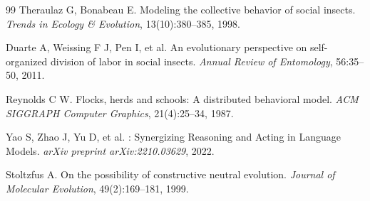 \documentclass[12pt,a4paper]{ctexart}
\begin{document}
\begin{thebibliography}{99}
Theraulaz G, Bonabeau E.
\newblock Modeling the collective behavior of social insects.
\newblock \emph{Trends in Ecology \& Evolution}, 13(10):380--385, 1998.

Duarte A, Weissing F J, Pen I, et al.
\newblock An evolutionary perspective on self-organized division of labor in social insects.
\newblock \emph{Annual Review of Entomology}, 56:35--50, 2011.

Reynolds C W.
\newblock Flocks, herds and schools: A distributed behavioral model.
\newblock \emph{ACM SIGGRAPH Computer Graphics}, 21(4):25--34, 1987.

Yao S, Zhao J, Yu D, et al.
: Synergizing Reasoning and Acting in Language Models.
\newblock \emph{arXiv preprint arXiv:2210.03629}, 2022.

Stoltzfus A.
\newblock On the possibility of constructive neutral evolution.
\newblock \emph{Journal of Molecular Evolution}, 49(2):169--181, 1999.

\end{thebibliography}
\end{document}

